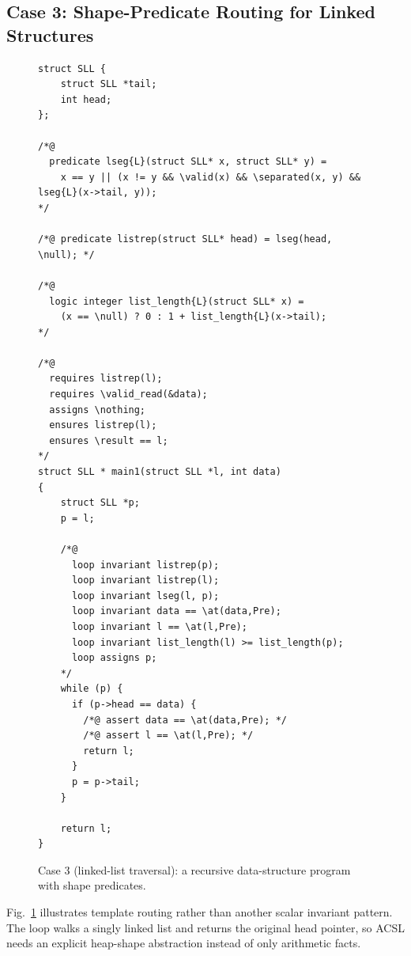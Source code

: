 \subsection{Case 3: Shape-Predicate Routing for Linked Structures}

\begin{figure}[!t]
    \centering
    \begin{tcolorbox}[casebox, title={Case 3: route-selected shape predicates}]
\begin{lstlisting}[style=caseinnerstyle]
struct SLL {
    struct SLL *tail;
    int head;
};

/*@
  predicate lseg{L}(struct SLL* x, struct SLL* y) =
    x == y || (x != y && \valid(x) && \separated(x, y) && lseg{L}(x->tail, y));
*/

/*@ predicate listrep(struct SLL* head) = lseg(head, \null); */

/*@
  logic integer list_length{L}(struct SLL* x) =
    (x == \null) ? 0 : 1 + list_length{L}(x->tail);
*/

/*@
  requires listrep(l);
  requires \valid_read(&data);
  assigns \nothing;
  ensures listrep(l);
  ensures \result == l;
*/
struct SLL * main1(struct SLL *l, int data)
{
    struct SLL *p;
    p = l;

    /*@
      loop invariant listrep(p);
      loop invariant listrep(l);
      loop invariant lseg(l, p);
      loop invariant data == \at(data,Pre);
      loop invariant l == \at(l,Pre);
      loop invariant list_length(l) >= list_length(p);
      loop assigns p;
    */
    while (p) {
      if (p->head == data) {
        /*@ assert data == \at(data,Pre); */
        /*@ assert l == \at(l,Pre); */
        return l;
      }
      p = p->tail;
    }

    return l;
}
\end{lstlisting}
    \end{tcolorbox}
    \caption{Case 3 (linked-list traversal): a recursive data-structure program with shape predicates.}
    \label{fig:case4}
\end{figure}

Fig.~\ref{fig:case4} illustrates template routing rather than another scalar invariant pattern. The loop walks a singly linked list and returns the original head pointer, so ACSL needs an explicit heap-shape abstraction instead of only arithmetic facts.

